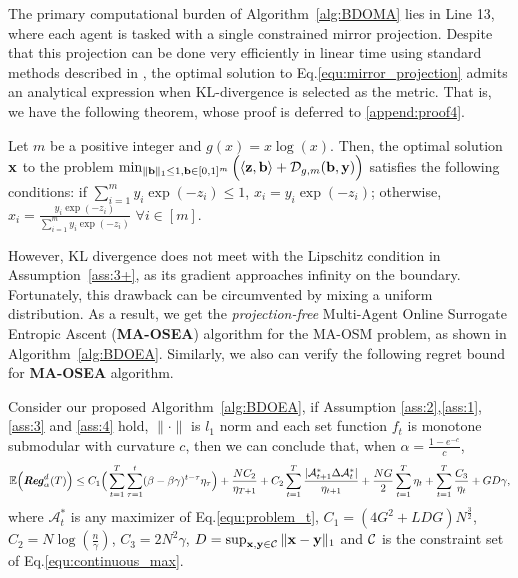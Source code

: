 		The primary computational burden of Algorithm~\ref{alg:BDOMA} lies in Line 13, where each agent is tasked with a single constrained mirror projection. Despite that this projection can be done very efficiently in linear time using standard methods described in \citep{pardalos1990algorithm,brucker1984n}, the optimal solution to Eq.\eqref{equ:mirror_projection} admits an analytical expression when KL-divergence is selected as the metric. That is, we have the following theorem, whose proof is deferred to \cref{append:proof4}.
	\begin{theorem}\label{thm:projection}
		Let $m$ be a positive integer and  $g(x)=x\log(x)$. Then, the optimal solution $\mathbf{x}$ to the problem $\min_{\|\mathbf{b}\|_{1}\le1, \mathbf{b}\in[0,1]^{m}}\Big(\langle\mathbf{z},\mathbf{b}\rangle+\mathcal{D}_{g,m}(\mathbf{b}, \mathbf{y})\Big)$ satisfies the following conditions: if $\sum_{i=1}^{m}y_{i}\exp(-z_{i})\le1$, $x_{i}=y_{i}\exp(-z_{i})$; otherwise,  $x_{i}=\frac{y_{i}\exp(-z_{i})}{\sum_{i=1}^{m}y_{i}\exp(-z_{i})}$ $\forall i\in[m]$.
		\end{theorem}
		However, KL divergence does not meet with the Lipschitz condition in Assumption~\ref{ass:3+}, as its gradient approaches infinity on the boundary.
		 Fortunately, this drawback can be circumvented by mixing a uniform distribution. As a result, we get the \emph{projection-free} Multi-Agent Online Surrogate Entropic Ascent (\textbf{MA-OSEA}) algorithm for the MA-OSM problem, as shown in Algorithm~\ref{alg:BDOEA}. Similarly, we also can verify the following regret bound for \textbf{MA-OSEA} algorithm.
		\begin{theorem}
		\label{thm:final_one1}
		Consider our proposed Algorithm~\ref{alg:BDOEA}, if Assumption \ref{ass:2},\ref{ass:1},\ref{ass:3} and \ref{ass:4} hold, $\|\cdot\|$ is $l_{1}$ norm and each set function $f_{t}$ is monotone submodular with curvature $c$, then we can conclude that, when $\alpha=\frac{1-e^{-c}}{c}$,
\begin{equation}\label{equ:th2_uncomplete_equation}
		\mathbb{E}\Big(\textbf{\emph{Reg}}^{d}_{\alpha}(T)\Big)\le C_{1}\Big(\sum_{t=1}^{T}\sum_{\tau=1}^{t}(\beta-\beta\gamma)^{t-\tau}\eta_{\tau}\Big)+\frac{NC_{2}}{\eta_{T+1}}+C_{2}\sum_{t=1}^{T}\frac{|\mathcal{A}_{t+1}^{*}\Delta\mathcal{A}_{t}^{*}|}{\eta_{t+1}}+\frac{NG}{2}\sum_{t=1}^{T}\eta_{t}+\sum_{t=1}^{T}\frac{C_{3}}{\eta_{t}}+GD\gamma,
 		\end{equation} where $\mathcal{A}_{t}^{*}$ is any maximizer of Eq.\eqref{equ:problem_t},  $C_{1}=(4G^{2}+LDG)N^{\frac{3}{2}}$, $C_{2}=N\log(\frac{n}{\gamma})$, $C_{3}=2N^{2}\gamma$, $D=\sup_{\mathbf{x},\mathbf{y}\in\mathcal{C}}\|\mathbf{x}-\mathbf{y}\|_{1}$ and $\mathcal{C}$ is the constraint set of Eq.\eqref{equ:continuous_max}.
		
	\end{theorem}
